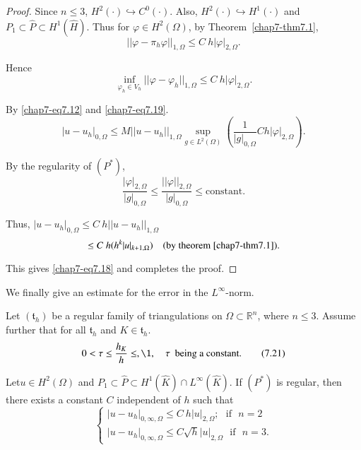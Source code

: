\begin{proof}
Since $n\leq 3$, $H^{2}(\cdot)\hookrightarrow C^{0}(\cdot)$. Also,
$H^{2}(\cdot)\hookrightarrow H^{1}(\cdot)$ and $P_{1}\subset
\hat{P}\subset H^{1}(\hat{H})$. Thus for $\varphi\in H^{2}(\Omega)$,
by Theorem~\ref{chap7-thm7.1},
$$
||\varphi-\pi_{h}\varphi||_{1,\Omega}\leq C\ h|\varphi|_{2,\Omega}.
$$

Hence
\begin{equation*}
\inf\limits_{\varphi_{h}\in
  V_{h}}||\varphi-\varphi_{h}||_{1,\Omega}\leq
C\ h|\varphi|_{2,\Omega}.\tag{7.19}\label{chap7-eq7.19} 
\end{equation*}

By \eqref{chap7-eq7.12} and \eqref{chap7-eq7.19}.
$$
|u-u_{h}|_{0,\Omega}\leq M||u-u_{h}||_{1,\Omega}\sup\limits_{g\in
  L^{2}(\Omega)}\left(\frac{1}{|g|_{0,\Omega}}Ch|\varphi|_{2,\Omega}\right). 
$$

By the regularity of $(P^{*})$,
\begin{equation*}
\frac{|\varphi|_{2,\Omega}}{|g|_{0,\Omega}}\leq
\frac{||\varphi||_{2,\Omega}}{|g|_{0,\Omega}}\leq \text{
  constant}.\tag{7.20}\label{chap7-eq7.20} 
\end{equation*}

Thus, $|u-u_{h}|_{0,\Omega}\leq C\ h||u-u_{h}||_{1,\Omega}$
$$
\leq C\ h(h^{k}|u|_{k+1,\Omega})\quad\text{(by theorem~\ref{chap7-thm7.1})}.
$$

This gives \eqref{chap7-eq7.18} and completes the proof.
\end{proof}

We finally give an estimate for the error in the $L^{\infty}$-norm.

\begin{theorem}\label{chap7-thm7.5}
Let $(\mathfrak{t}_{h})$ be a regular family of triangulations on
$\Omega\subset \mathbb{R}^{n}$, where $n\leq 3$. Assume further that for
all $\mathfrak{t}_{h}$ and $K\in \mathfrak{t}_{h}$.
\begin{equation*}
0<\tau\leq \frac{h_{K}}{h}\leq ,\1,\quad \tau~\text{ being a
  constant.}\tag{7.21}\label{chap7-eq7.21} 
\end{equation*}

Let\pageoriginale $u\in H^{2}(\Omega)$ and $P_{1}\subset
\hat{P}\subset H^{1}(\hat{K})\cap L^{\infty}(\hat{K})$. If
$(P^{\ast})$ is regular, then there exists a constant $C$ independent
of $h$ such that
\begin{equation*}
\begin{cases}
|u-u_{h}|_{0,\infty,\Omega}\leq C\ h|u|_{2,\Omega};\text{~ if~ }n=2\\
|u-u_{h}|_{0,\infty,\Omega}\leq C\sqrt{h}|u|_{2,\Omega}\text{~ if~ } n=3.
\end{cases}\tag{7.22}\label{chap7-eq7.22}
\end{equation*}
\end{theorem}

